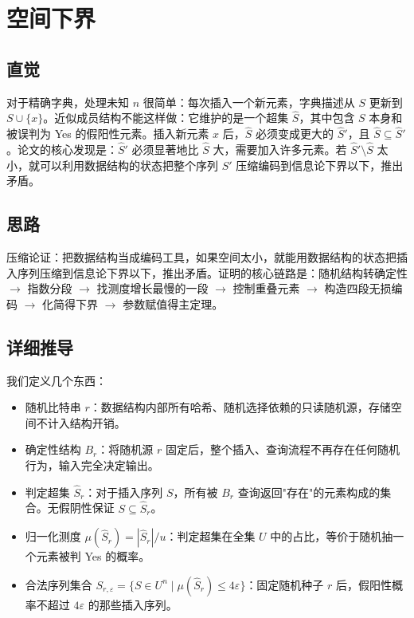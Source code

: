 \documentclass[UTF8,11pt,a4paper]{ctexart}
\begin{document}
\section{空间下界}

\subsection{直觉}

对于精确字典，处理未知 $n$ 很简单：每次插入一个新元素，字典描述从 $S$ 更新到 $S \cup \{x\}$。近似成员结构不能这样做：它维护的是一个超集 $\hat{S}$，其中包含 $S$ 本身和被误判为 Yes 的假阳性元素。插入新元素 $x$ 后，$\hat{S}$ 必须变成更大的 $\hat{S}'$，且 $\hat{S} \subseteq \hat{S}'$。论文的核心发现是：$\hat{S}'$ 必须显著地比 $\hat{S}$ 大，需要加入许多元素。若 $\hat{S}' \setminus \hat{S}$ 太小，就可以利用数据结构的状态把整个序列 $S'$ 压缩编码到信息论下界以下，推出矛盾。

\subsection{思路}

压缩论证：把数据结构当成编码工具，如果空间太小，就能用数据结构的状态把插入序列压缩到信息论下界以下，推出矛盾。证明的核心链路是：随机结构转确定性 $\to$ 指数分段 $\to$ 找测度增长最慢的一段 $\to$ 控制重叠元素 $\to$ 构造四段无损编码 $\to$ 化简得下界 $\to$ 参数赋值得主定理。

\subsection{详细推导}

我们定义几个东西：
\begin{itemize}
    \item 随机比特串 $r$：数据结构内部所有哈希、随机选择依赖的只读随机源，存储空间不计入结构开销。
    \item 确定性结构 $B_r$：将随机源 $r$ 固定后，整个插入、查询流程不再存在任何随机行为，输入完全决定输出。
    \item 判定超集 $\hat{S}_r$：对于插入序列 $S$，所有被 $B_r$ 查询返回"存在"的元素构成的集合。无假阴性保证 $S \subseteq \hat{S}_r$。
    \item 归一化测度 $\mu(\hat{S}_r) = |\hat{S}_r|/u$：判定超集在全集 $U$ 中的占比，等价于随机抽一个元素被判 Yes 的概率。
    \item 合法序列集合 $S_{r,\varepsilon} = \{S \in U^n \mid \mu(\hat{S}_r) \le 4\varepsilon\}$：固定随机种子 $r$ 后，假阳性概率不超过 $4\varepsilon$ 的那些插入序列。
\end{itemize}
\end{document}
